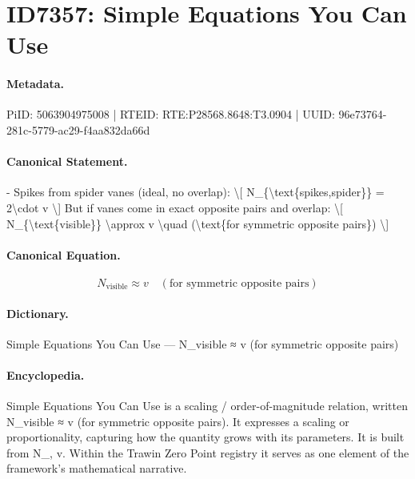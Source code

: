 \section*{ID7357: Simple Equations You Can Use}
\paragraph{Metadata.}
PiID: 5063904975008 | RTEID: RTE:P28568.8648:T3.0904 | UUID: 96e73764-281c-5779-ac29-f4aa832da66d

\paragraph{Canonical Statement.}
- Spikes from spider vanes (ideal, no overlap): \textbackslash{}[ N\_\{\textbackslash{}text\{spikes,spider\}\} = 2\textbackslash{}cdot v \textbackslash{}] But if vanes come in exact opposite pairs and overlap: \textbackslash{}[ N\_\{\textbackslash{}text\{visible\}\} \textbackslash{}approx v \textbackslash{}quad (\textbackslash{}text\{for symmetric opposite pairs\}) \textbackslash{}]

\paragraph{Canonical Equation.}
\[
N_{\text{visible}} \approx v \quad (\text{for symmetric opposite pairs})
\]

\paragraph{Dictionary.}
Simple Equations You Can Use — N\_visible ≈ v (for symmetric opposite pairs)

\paragraph{Encyclopedia.}
Simple Equations You Can Use is a scaling / order-of-magnitude relation, written N\_visible ≈ v (for symmetric opposite pairs). It expresses a scaling or proportionality, capturing how the quantity grows with its parameters. It is built from N\_, v. Within the Trawin Zero Point registry it serves as one element of the framework's mathematical narrative.

